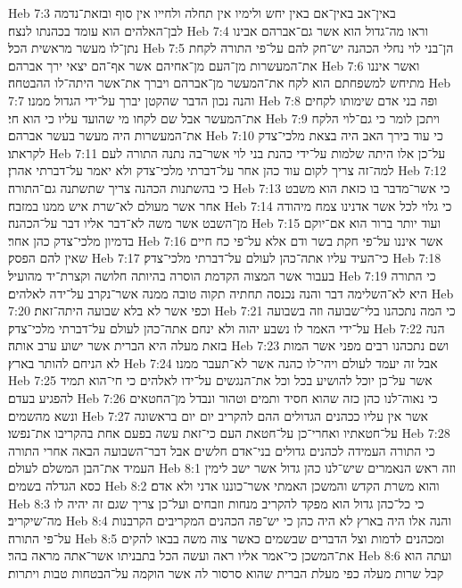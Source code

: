 Heb 7:3  באין־אב באין־אם באין יחש ולימיו אין תחלה ולחייו אין סוף ובזאת־נדמה לבן־האלהים הוא עומד בכהנתו לנצח׃
Heb 7:4  וראו מה־גדול הוא אשר גם־אברהם אבינו נתן־לו מעשר מראשית הכל׃
Heb 7:5  הן־בני לוי נחלי הכהנה יש־חק להם על־פי התורה לקחת את־המעשרות מן־העם מן־אחיהם אשר אף־הם יצאי ירך אברהם׃
Heb 7:6  ואשר איננו מתיחש למשפחתם הוא לקח את־המעשר מן־אברהם ויברך את־אשר היתה־לו ההבטחה׃
Heb 7:7  והנה נכון הדבר שהקטן יברך על־ידי הגדול ממנו׃
Heb 7:8  ופה בני אדם שימותו לקחים את־המעשר אבל שם לקחו מי שהועד עליו כי הוא חי׃
Heb 7:9  ויתכן לומר כי גם־לוי הלקח את־המעשרות היה מעשר בעשר אברהם׃
Heb 7:10  כי עוד בירך האב היה בצאת מלכי־צדק לקראתו׃
Heb 7:11  על־כן אלו היתה שלמות על־ידי כהנת בני לוי אשר־בה נתנה התורה לעם למה־זה צריך לקום עוד כהן אחר על־דברתי מלכי־צדק ולא יאמר על־דברתי אהרן׃
Heb 7:12  כי בהשתנות הכהנה צריך שתשתנה גם־התורה׃
Heb 7:13  כי אשר־מדבר בו כזאת הוא משבט אחר אשר מעולם לא־שרת איש ממנו במזבח׃
Heb 7:14  כי גלוי לכל אשר אדנינו צמח מיהודה מן־השבט אשר משה לא־דבר אליו דבר על־הכהנה׃
Heb 7:15  ועוד יותר ברור הוא אם־יוקם בדמיון מלכי־צדק כהן אחר׃
Heb 7:16  אשר איננו על־פי חקת בשר ודם אלא על־פי כח חיים שאין להם הפסק׃
Heb 7:17  כי־העיד עליו אתה־כהן לעולם על־דברתי מלכי־צדק׃
Heb 7:18  בעבור אשר המצוה הקדמת הוסרה בהיותה חלושה וקצרת־יד מהועיל׃
Heb 7:19  כי התורה היא לא־השלימה דבר והנה נכנסה תחתיה תקוה טובה ממנה אשר־נקרב על־ידה לאלהים׃
Heb 7:20  וכפי אשר לא בלא שבועה היתה־זאת׃
Heb 7:21  כי המה נתכהנו בלי־שבועה וזה בשבועה על־ידי האמר לו נשבע יהוה ולא ינחם אתה־כהן לעולם על־דברתי מלכי־צדק׃
Heb 7:22  הנה בזאת מעלה היא הברית אשר ישוע ערב אותה׃
Heb 7:23  ושם נתכהנו רבים מפני אשר המות לא הניחם להותר בארץ׃
Heb 7:24  אבל זה יעמד לעולם ויהי־לו כהנה אשר לא־תעבר ממנו׃
Heb 7:25  אשר על־כן יוכל להושיע בכל וכל את־הנגשים על־ידו לאלהים כי חי־הוא תמיד להפגיע בעדם׃
Heb 7:26  כי נאוה־לנו כהן כזה שהוא חסיד ותמים וטהור ונבדל מן־החטאים ונשא מהשמים׃
Heb 7:27  אשר אין עליו ככהנים הגדולים ההם להקריב יום יום בראשונה על־חטאתיו ואחרי־כן על־חטאת העם כי־זאת עשה בפעם אחת בהקריבו את־נפשו׃
Heb 7:28  כי התורה העמידה לכהנים גדולים בני־אדם חלשים אבל דבר־השבועה הבאה אחרי התורה העמיד את־הבן המשלם לעולם׃
Heb 8:1  וזה ראש הנאמרים שיש־לנו כהן גדול אשר ישב לימין כסא הגדלה בשמים׃
Heb 8:2  והוא משרת הקדש והמשכן האמתי אשר־כוננו אדני ולא אדם׃
Heb 8:3  כי כל־כהן גדול הוא מפקד להקריב מנחות וזבחים ועל־כן צריך שגם זה יהיה לו מה־שיקריב׃
Heb 8:4  והנה אלו היה בארץ לא היה כהן כי יש־פה הכהנים המקריבים הקרבנות על־פי התורה׃
Heb 8:5  ומכהנים לדמות וצל הדברים שבשמים כאשר צוה משה בבאו להקים את־המשכן כי־אמר אליו ראה ועשה הכל בתבניתו אשר־אתה מראה בהר׃
Heb 8:6  ועתה הוא קבל שרות מעלה כפי מעלת הברית שהוא סרסור לה אשר הוקמה על־הבטחות טבות ויתרות׃
